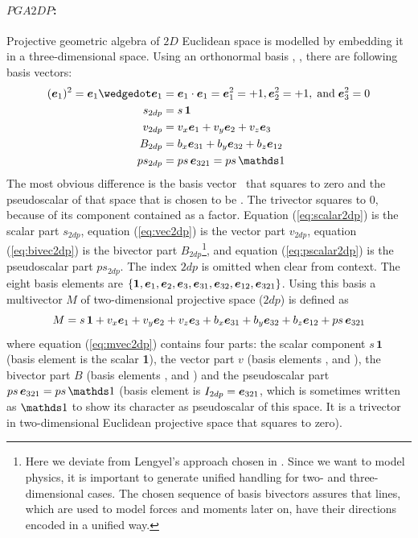 \paragraph{$PGA2DP$:}
Projective geometric algebra of $2D$ Euclidean space is modelled by embedding it in a
three-dimensional space. Using an orthonormal basis , ,  there are
following basis vectors:
\begin{subequations}
    \begin{align}
        (\bv{1})^2 = \bv{1} \wedgedot \bv1 & = \bv{1} \cdot \bv1 = \bv{1}^2 = +1,
        \bv{2}^2 = +1, \;\text{and}\; \bv{3}^2 = 0  \nonumber\\ 
        s_{2dp} & = s \, \bm{1}
        \label{eq:scalar2dp} \\
        v_{2dp} & = v_x\bv{1} + v_y\bv{2} + v_z\bv{3} 
        \label{eq:vec2dp} \\ 
        B_{2dp} & = b_{x}\bv{31} + b_{y}\bv{32} + b_{z}\bv{12} 
        \label{eq:bivec2dp} \\ 
        ps_{2dp} & = ps \, \bv{321}  = ps \, \ps
        \label{eq:pscalar2dp}
    \end{align}
\end{subequations}
The most obvious difference is the basis vector~ that squares to zero and the
pseudoscalar of that space that is chosen to be . The trivector  squares
to $0$, because of its component  contained as a factor. Equation
(\ref{eq:scalar2dp}) is the scalar part $s_{2dp}$, equation (\ref{eq:vec2dp}) is the
vector part $v_{2dp}$, equation (\ref{eq:bivec2dp}) is the bivector part
$B_{2dp}$\footnote{Here we deviate from Lengyel's approach chosen in
\cite{Lengyel_pga-illuminated:2024}. Since we want to model physics, it is important to
generate unified handling for two- and three-dimensional cases.  The chosen sequence of
basis bivectors assures that lines, which are used to model forces and moments later on,
have their directions encoded in a unified way.}, and equation (\ref{eq:pscalar2dp}) is
the pseudoscalar part $ps_{2dp}$. The index $2dp$ is omitted when clear from context. The
eight basis elements are $\{\bm{1}, \bm{e}_{1}, \bm{e}_{2}, \bm{e}_{3}, \bm{e}_{31}, \bm{e}_{32}, \bm{e}_{12},
\bm{e}_{321}\}$. Using this basis a multivector $M$ of two-dimensional projective space
($2dp$) is defined as
\begin{equation}
    M = s \, \bm{1} + v_x\bm{e}_{1} + v_y\bm{e}_{2} + v_z\bm{e}_{3} 
    + b_x\bm{e}_{31} + b_y\bm{e}_{32} + b_z\bm{e}_{12} + ps \, \bm{e}_{321}
    \label{eq:mvec2dp}  
\end{equation}
where equation (\ref{eq:mvec2dp}) contains four parts: the scalar component $s \, \bm{1}$
(basis element is the scalar \textbf{1}), the vector part $v$ (basis elements ,
 and ), the bivector part $B$ (basis elements ,  and )
and the pseudoscalar part $ps \, \bv{321} = ps \, \ps$ (basis element is
$I_{2dp} = \bm{e}_{321}$, which is sometimes written as $\ps$ to show its character
as pseudoscalar of this space. It is a trivector in two-dimensional Euclidean projective
space that squares to zero). \\

